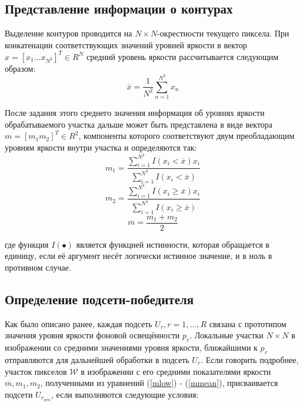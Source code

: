 \documentclass[a4paper,12pt]{report}
\begin{document}
\subsection{Представление информации о контурах}

Выделение контуров проводится на $N\times N$-окрестности текущего пиксела. При конкатенации соответствующих значений уровней яркости в вектор $x=[x_1 ... x_{N^2}]^T\in R^N$ средний уровень яркости рассчитывается следующим образом:
\begin{equation}
\overline{x}=\frac{1}{N^2}\sum_{n=1}^{N^2} x_n
\end{equation}

После задания этого среднего значения информация об уровнях яркости обрабатываемого участка дальше может быть представлена в виде вектора $m=[m_1 m_2]^T\in R^2$, компоненты которого соответствуют двум преобладающим уровням яркости внутри участка и определяются так:
\begin{equation}
m_1=\frac{\sum_{i=1}^{N^2}I(x_i<\overline{x})x_i}{\sum_{i=1}^{N^2}I(x_i<\overline{x})}
\label{mlow}
\end{equation}
\begin{equation}
m_2=\frac{\sum_{i=1}^{N^2}I(x_i\geq\overline{x})x_i}{\sum_{i=1}^{N^2}I(x_i\geq\overline{x})}
\label{mhigh}
\end{equation}
\begin{equation}
\overline{m}=\frac{m_1+m_2}{2}
\label{mmean}
\end{equation}

где функция $I(\bullet)$ является функцией истинности, которая обращается в единицу, если её аргумент несёт логически истинное значение, и в ноль в противном случае.

\subsection{Определение подсети-победителя}
 
Как было описано ранее, каждая подсеть $U_r,r=1,...,R$ связана с прототипом значения уровня яркости фоновой освещённости $p_r$. Локальные участки $N\times N$ в изображении со средними значениями уровня яркости, ближайшими к $p_r$ отправляются для дальнейшей обработки в подсеть $U_r$. Если говорить подробнее, участок пикселов $\mathcal{W}$ в изображении с его средними показателями яркости $\overline{m},m_1,m_2$, полученными из уравнений (\ref{mlow}) - (\ref{mmean}), присваивается подсети $U_{r_{win}}$, если выполняются следующие условия:
\end{document}
